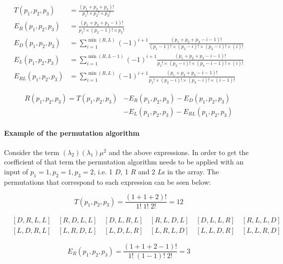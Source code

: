 \begin{align}
    T(p_1, p_2, p_3) &= \frac{(p_1 + p_2 + p_3)!}{p_1! \times p_2! \times p_3!} \\
    E_R(p_1, p_2, p_3) &= \frac{(p_1 + p_2 + p_3 - 1)!}
    {p_1! \times (p_2-1)! \times p_3!} \\
    E_D(p_1, p_2, p_3) &= \sum_{i=1}^{\min(R,L)} (-1)^{i+1}
    \frac{(p_1 + p_2 + p_3 - i - 1)!}
    {(p_1 - 1)! \times (p_2 - i)! \times (p_3 - i)! \times (i)!} \\
    E_L(p_1, p_2, p_3) &= \sum_{i=1}^{\min(R,L-1)} (-1)^{i+1}
    \frac{(p_1 + p_2 + p_3 - i - 1)!}
    {p_1! \times (p_2 - i)! \times (p_3 - i - 1)! \times (i)!} \\
    E_{RL}(p_1, p_2, p_3) &= \sum_{i=1}^{\min(R,L)} (-1)^{i+1}
    \frac{(p_1 + p_2 + p_3 - i - 1)!}
    {p_1! \times (p_2 - i)! \times (p_3 - i)! \times (i - 1)!}
\end{align}

\begin{align*}
    R(p_1, p_2, p_3) = T(p_1, p_2, p_3) & - E_R(p_1, p_2, p_3) -
    E_D(p_1, p_2, p_3) \\
    & - E_L(p_1, p_2, p_3) - E_{RL}(p_1, p_2, p_3)
\end{align*}

\paragraph{Example of the permutation algorithm}
Consider the term \((\lambda_2) (\lambda_1) \mu^2\) and the above expressions.
In order to get the coefficient of that term the permutation algorithm needs to
be applied with an input of \(p_1=1, p_2=1, p_3=2\), i.e. 1 \(D\), 1 \(R\) and 2
\(L\)s in the array.
The permutations that correspond to each expression can be seen below:

\begin{equation*}
    T(p_1, p_2, p_3) = \frac{(1+1+2)!}{1! \; 1! \; 2!} = 12
\end{equation*}

\begin{align*}
    & [D, R, L, L] \quad [R, D, L, L] \quad [D, L, R, L] \quad
    [R, L, D, L] \quad [D, L, L, R] \quad [R, L, L, D] \\
    & [L, D, R, L] \quad [L, R, D, L] \quad [L, D, L, R] \quad
    [L, R, L, D] \quad [L, L, D, R] \quad [L, L, R, D]
\end{align*}

\begin{equation*}
    E_R(p_1, p_2, p_3) = \frac{(1+1+2-1)!}{1! \; (1-1)! \; 2!} = 3
\end{equation*}

